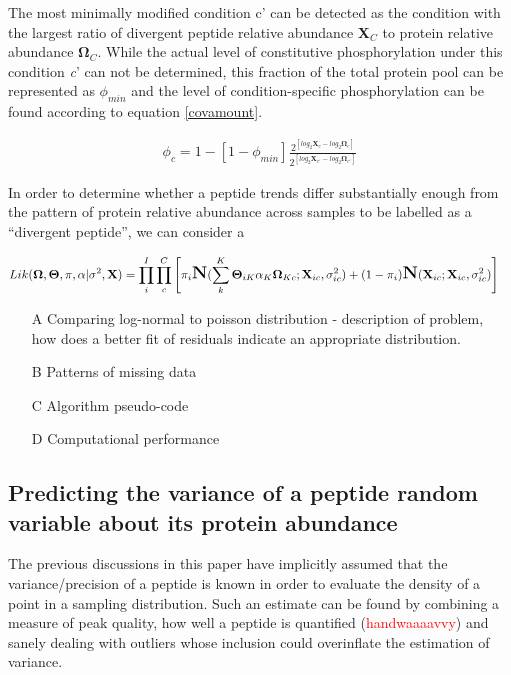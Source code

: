 \documentclass[12pt]{article}
\begin{document}
The most minimally modified condition c' can be detected as the condition with the largest ratio of divergent peptide relative abundance \textbf{X}$_{C}$ to protein relative abundance $\boldsymbol\Omega_{C}$. While the actual level of constitutive phosphorylation under this condition \textit{c}' can not be determined, this fraction of the total protein pool can be represented as $\phi_{min}$ and the level of condition-specific phosphorylation can be found
according to equation \ref{covamount}.

\begin{align}
\phi_{c} = 1 - [1 - \phi_{min}]\frac{2^{[log_{2}\textbf{X}_{c} - log_{2}\boldsymbol\Omega_{c}]}}{2^{[log_{2}\textbf{X}_{c'} - log_{2}\boldsymbol\Omega_{c'}]}}\label{covamount}
\end{align}

In order to determine whether a peptide trends differ substantially enough from the pattern of protein relative abundance across samples to be labelled as a ``divergent peptide'', we can consider a

\begin{align}
Lik(\mathbf{\Omega}, \mathbf{\Theta}, \pi, \alpha | \sigma^{2}, \textbf{X}) &= \prod_{i}^{I}\prod_{c}^{C}\left[ \pi_{i}\mbox{\Large \textbf{N}}(\sum_{k}^{K}\mathbf{\Theta}_{iK}\alpha_{K}\mathbf{\Omega}_{Kc} ; \textbf{X}_{ic}, \sigma^{2}_{ic}) + (1-\pi_{i})\mbox{\Large \textbf{N}}( \textbf{X}_{ic}; \textbf{X}_{ic}, \sigma^{2}_{ic}) \right]
\end{align}

\color{red}
\begin{itemize}
\item[A] Comparing log-normal to poisson distribution - description of problem, how does a better fit of residuals indicate an appropriate distribution.
\item[B] Patterns of missing data
\item[C] Algorithm pseudo-code
\item[D] Computational performance
\end{itemize}
\color{black}

\subsection*{Predicting the variance of a peptide random variable about its protein abundance}

The previous discussions in this paper have implicitly assumed that the variance/precision of a peptide is known in order to evaluate the density of a point in a sampling distribution.  Such an estimate can be found by combining a measure of peak quality, how well a peptide is quantified (\textcolor{red}{handwaaaavvy}) and sanely dealing with outliers whose inclusion could overinflate the estimation of variance.
\end{document}
